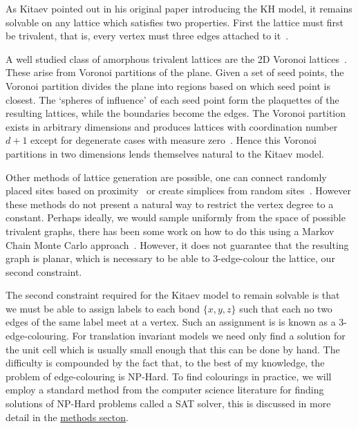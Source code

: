 As Kitaev pointed out in his original paper introducing the KH model, it remains solvable on any lattice which satisfies two properties. First the lattice must first be trivalent, that is, every vertex must three edges attached to it~\autocite{kitaevAnyonsExactlySolved2006,Nussinov2009}.

A well studied class of amorphous trivalent lattices are the 2D Voronoi lattices~\autocite{mitchellAmorphousTopologicalInsulators2018,florescu_designer_2009,marsalTopologicalWeaireThorpeModels2020}. These arise from Voronoi partitions of the plane. Given a set of seed points, the Voronoi partition divides the plane into regions based on which seed point is closest. The `spheres of influence' of each seed point form the plaquettes of the resulting lattices, while the boundaries become the edges. The Voronoi partition exists in arbitrary dimensions and produces lattices with coordination number \(d+1\) except for degenerate cases with measure zero~\autocite{voronoiNouvellesApplicationsParamètres1908,watsonComputingNdimensionalDelaunay1981}. Hence this Voronoi partitions in two dimensions lends themselves natural to the Kitaev model.

Other methods of lattice generation are possible, one can connect randomly placed sites based on proximity~\autocite{agarwala2019topological} or create simplices from random sites~\autocite{christRandomLatticeField1982}. However these methods do not present a natural way to restrict the vertex degree to a constant. Perhaps ideally, we would sample uniformly from the space of possible trivalent graphs, there has been some work on how to do this using a Markov Chain Monte Carlo approach~\autocite{alyamiUniformSamplingDirected2016}. However, it does not guarantee that the resulting graph is planar, which is necessary to be able to 3-edge-colour the lattice, our second constraint.

The second constraint required for the Kitaev model to remain solvable is that we must be able to assign labels to each bond \(\{x,y,z\}\) such that each no two edges of the same label meet at a vertex. Such an assignment is is known as a 3-edge-colouring. For translation invariant models we need only find a solution for the unit cell which is usually small enough that this can be done by hand. The difficulty is compounded by the fact that, to the best of my knowledge, the problem of edge-colouring is NP-Hard. To find colourings in practice, we will employ a standard method from the computer science literature for finding solutions of NP-Hard problems called a SAT solver, this is discussed in more detail in the \protect\hyperlink{amk-methods}{methods secton}.

